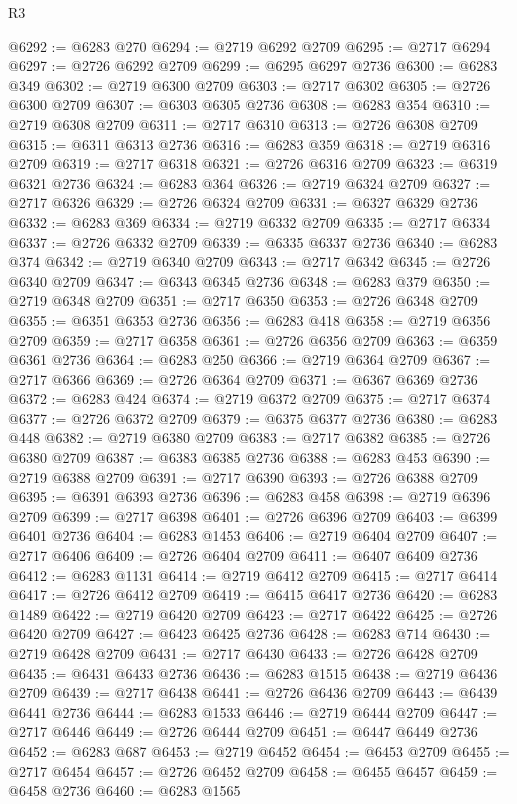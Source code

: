 \begin{lexlean}{R3}
\begin{coremodule}
@6292 := @6283 @270
@6294 := @2719 @6292 @2709
@6295 := @2717 @6294
@6297 := @2726 @6292 @2709
@6299 := @6295 @6297 @2736
@6300 := @6283 @349
@6302 := @2719 @6300 @2709
@6303 := @2717 @6302
@6305 := @2726 @6300 @2709
@6307 := @6303 @6305 @2736
@6308 := @6283 @354
@6310 := @2719 @6308 @2709
@6311 := @2717 @6310
@6313 := @2726 @6308 @2709
@6315 := @6311 @6313 @2736
@6316 := @6283 @359
@6318 := @2719 @6316 @2709
@6319 := @2717 @6318
@6321 := @2726 @6316 @2709
@6323 := @6319 @6321 @2736
@6324 := @6283 @364
@6326 := @2719 @6324 @2709
@6327 := @2717 @6326
@6329 := @2726 @6324 @2709
@6331 := @6327 @6329 @2736
@6332 := @6283 @369
@6334 := @2719 @6332 @2709
@6335 := @2717 @6334
@6337 := @2726 @6332 @2709
@6339 := @6335 @6337 @2736
@6340 := @6283 @374
@6342 := @2719 @6340 @2709
@6343 := @2717 @6342
@6345 := @2726 @6340 @2709
@6347 := @6343 @6345 @2736
@6348 := @6283 @379
@6350 := @2719 @6348 @2709
@6351 := @2717 @6350
@6353 := @2726 @6348 @2709
@6355 := @6351 @6353 @2736
@6356 := @6283 @418
@6358 := @2719 @6356 @2709
@6359 := @2717 @6358
@6361 := @2726 @6356 @2709
@6363 := @6359 @6361 @2736
@6364 := @6283 @250
@6366 := @2719 @6364 @2709
@6367 := @2717 @6366
@6369 := @2726 @6364 @2709
@6371 := @6367 @6369 @2736
@6372 := @6283 @424
@6374 := @2719 @6372 @2709
@6375 := @2717 @6374
@6377 := @2726 @6372 @2709
@6379 := @6375 @6377 @2736
@6380 := @6283 @448
@6382 := @2719 @6380 @2709
@6383 := @2717 @6382
@6385 := @2726 @6380 @2709
@6387 := @6383 @6385 @2736
@6388 := @6283 @453
@6390 := @2719 @6388 @2709
@6391 := @2717 @6390
@6393 := @2726 @6388 @2709
@6395 := @6391 @6393 @2736
@6396 := @6283 @458
@6398 := @2719 @6396 @2709
@6399 := @2717 @6398
@6401 := @2726 @6396 @2709
@6403 := @6399 @6401 @2736
@6404 := @6283 @1453
@6406 := @2719 @6404 @2709
@6407 := @2717 @6406
@6409 := @2726 @6404 @2709
@6411 := @6407 @6409 @2736
@6412 := @6283 @1131
@6414 := @2719 @6412 @2709
@6415 := @2717 @6414
@6417 := @2726 @6412 @2709
@6419 := @6415 @6417 @2736
@6420 := @6283 @1489
@6422 := @2719 @6420 @2709
@6423 := @2717 @6422
@6425 := @2726 @6420 @2709
@6427 := @6423 @6425 @2736
@6428 := @6283 @714
@6430 := @2719 @6428 @2709
@6431 := @2717 @6430
@6433 := @2726 @6428 @2709
@6435 := @6431 @6433 @2736
@6436 := @6283 @1515
@6438 := @2719 @6436 @2709
@6439 := @2717 @6438
@6441 := @2726 @6436 @2709
@6443 := @6439 @6441 @2736
@6444 := @6283 @1533
@6446 := @2719 @6444 @2709
@6447 := @2717 @6446
@6449 := @2726 @6444 @2709
@6451 := @6447 @6449 @2736
@6452 := @6283 @687
@6453 := @2719 @6452
@6454 := @6453 @2709
@6455 := @2717 @6454
@6457 := @2726 @6452 @2709
@6458 := @6455 @6457
@6459 := @6458 @2736
@6460 := @6283 @1565

\end{coremodule}
\end{lexlean}
